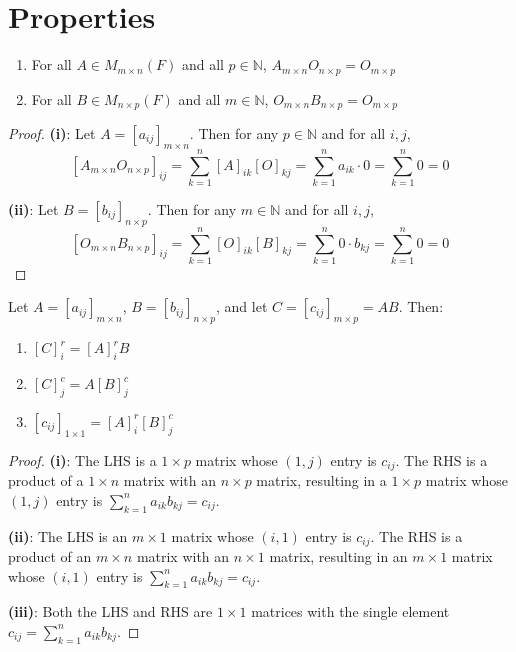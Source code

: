 \section{Properties}
\begin{proposition}\label{prop:zero-matrix-mult}
    \begin{enumerate}[label=(\roman*)]
        \item For all $A \in M_{m \times n}(F)$ and all $p \in \mathbb{N}$, $A_{m \times n} O_{n \times p} = O_{m \times p}$
        \item For all $B \in M_{n \times p}(F)$ and all $m \in \mathbb{N}$, $O_{m \times n} B_{n \times p} = O_{m \times p}$
    \end{enumerate}
\end{proposition}

\begin{proof}
    \textbf{(i)}: Let $A = [a_{ij}]_{m \times n}$. Then for any $p \in \mathbb{N}$ and for all $i,j$,
    \[
    [A_{m \times n} O_{n \times p}]_{ij} = \sum_{k=1}^{n} [A]_{ik}[O]_{kj} = \sum_{k=1}^{n} a_{ik} \cdot 0 = \sum_{k=1}^{n} 0 = 0
    \]
    
    \textbf{(ii)}: Let $B = [b_{ij}]_{n \times p}$. Then for any $m \in \mathbb{N}$ and for all $i,j$,
    \[
    [O_{m \times n} B_{n \times p}]_{ij} = \sum_{k=1}^{n} [O]_{ik}[B]_{kj} = \sum_{k=1}^{n} 0 \cdot b_{kj} = \sum_{k=1}^{n} 0 = 0
    \]
\end{proof}

\begin{lemma}\label{lem:row-column-products}
    Let $A = [a_{ij}]_{m \times n}$, $B = [b_{ij}]_{n \times p}$, and let $C = [c_{ij}]_{m \times p} = AB$. Then:
    \begin{enumerate}[label=(\roman*)]
        \item $[C]_i^r = [A]_i^r B$
        \item $[C]_j^c = A[B]_j^c$
        \item $[c_{ij}]_{1 \times 1} = [A]_i^r [B]_j^c$
    \end{enumerate}
\end{lemma}

\begin{proof}
    \textbf{(i)}: The LHS is a $1 \times p$ matrix whose $(1,j)$ entry is $c_{ij}$. The RHS is a product of a $1 \times n$ matrix with an $n \times p$ matrix, resulting in a $1 \times p$ matrix whose $(1,j)$ entry is $\sum_{k=1}^{n} a_{ik}b_{kj} = c_{ij}$.
    
    \textbf{(ii)}: The LHS is an $m \times 1$ matrix whose $(i,1)$ entry is $c_{ij}$. The RHS is a product of an $m \times n$ matrix with an $n \times 1$ matrix, resulting in an $m \times 1$ matrix whose $(i,1)$ entry is $\sum_{k=1}^{n} a_{ik}b_{kj} = c_{ij}$.
    
    \textbf{(iii)}: Both the LHS and RHS are $1 \times 1$ matrices with the single element $c_{ij} = \sum_{k=1}^{n} a_{ik}b_{kj}$.
\end{proof}

